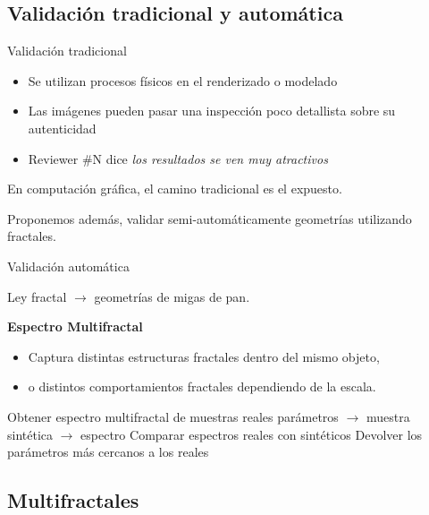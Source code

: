 \documentclass[spanish,unknownkeysallowed,10pt]{beamer}
\begin{document}
\subsection{Validación tradicional y automática}
\begin{frame}{Validación tradicional}
\begin{itemize}
\item Se utilizan procesos físicos en el renderizado o modelado
\item Las imágenes pueden pasar una inspección poco detallista sobre su autenticidad
\item Reviewer \#N dice \it{los resultados se ven muy atractivos}
\end{itemize}

En computación gráfica, el camino tradicional es el expuesto.

Proponemos además, validar semi-automáticamente geometrías utilizando fractales.

\end{frame}

\begin{frame}{Validación automática}

Ley fractal $\rightarrow$ geometrías de migas de pan.

\textbf{Espectro Multifractal}

\begin{itemize}
\item Captura distintas estructuras fractales dentro del mismo objeto,
\item o distintos comportamientos fractales dependiendo de la escala.
\end{itemize}

\begin{algorithm}[H]
\begin{algorithmic}[1]
\STATE Obtener espectro multifractal de muestras reales
\STATE parámetros $\rightarrow$ muestra sintética $\rightarrow$ espectro
\STATE Comparar espectros reales con sintéticos
\ENDFOR
\STATE Devolver los parámetros más cercanos a los reales
\end{algorithmic}
\end{algorithm}
\end{frame}


\subsection{Multifractales}
\end{document}
